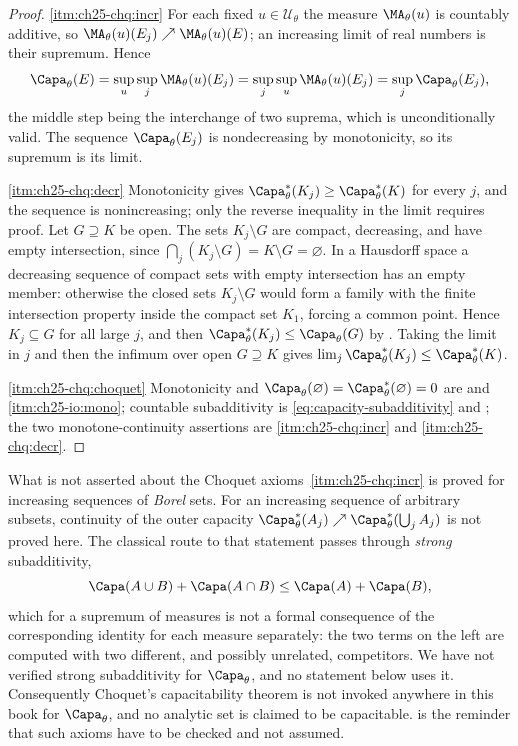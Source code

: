 \begin{proof}
\cref{itm:ch25-chq:incr}  For each fixed \(u\in\mathcal U_\theta\) the measure
\(\MA_\theta(u)\) is countably additive, so
\(\MA_\theta(u)(E_j)\nearrow\MA_\theta(u)(E)\); an increasing limit of real
numbers is their supremum.  Hence
\[
 \Capa_\theta(E)
 =\sup_u\sup_j\MA_\theta(u)(E_j)
 =\sup_j\sup_u\MA_\theta(u)(E_j)
 =\sup_j\Capa_\theta(E_j),
\]
the middle step being the interchange of two suprema, which is
unconditionally valid.  The sequence \(\Capa_\theta(E_j)\) is nondecreasing
by monotonicity, so its supremum is its limit.

\cref{itm:ch25-chq:decr}  Monotonicity gives
\(\Capa_\theta^*(K_j)\geq\Capa^*_\theta(K)\) for every \(j\), and the
sequence is nonincreasing; only the reverse inequality in the limit requires
proof.  Let \(G\supseteq K\) be open.  The sets \(K_j\setminus G\) are
compact, decreasing, and have empty intersection, since
\(\bigcap_j(K_j\setminus G)=K\setminus G=\varnothing\).  In a Hausdorff
space a decreasing sequence of compact sets with empty intersection has an
empty member: otherwise the closed sets \(K_j\setminus G\) would form a
family with the finite intersection property inside the compact set
\(K_1\), forcing a common point.  Hence \(K_j\subseteq G\) for all large
\(j\), and then
\(\Capa^*_\theta(K_j)\leq\Capa_\theta(G)\) by
.  Taking the limit in \(j\) and then the infimum
over open \(G\supseteq K\) gives
\(\lim_j\Capa^*_\theta(K_j)\leq\Capa^*_\theta(K)\).

\cref{itm:ch25-chq:choquet}  Monotonicity and
\(\Capa_\theta(\varnothing)=\Capa^*_\theta(\varnothing)=0\) are
 and
\,\cref{itm:ch25-io:mono}; countable subadditivity
is \eqref{eq:capacity-subadditivity} and
; the two monotone-continuity assertions
are \cref{itm:ch25-chq:incr} and \cref{itm:ch25-chq:decr}.
\end{proof}

\begin{warning}{What is not asserted about the Choquet axioms}
\,\cref{itm:ch25-chq:incr} is proved for
increasing sequences of \emph{Borel} sets.  For an increasing sequence of
arbitrary subsets, continuity of the outer capacity
\(\Capa^*_\theta(A_j)\nearrow\Capa^*_\theta(\bigcup_jA_j)\) is not proved
here.  The classical route to that statement passes through \emph{strong}
subadditivity,
\[
 \Capa(A\cup B)+\Capa(A\cap B)\leq\Capa(A)+\Capa(B),
\]
which for a supremum of measures is not a formal consequence of the
corresponding identity for each measure separately: the two terms on the left
are computed with two different, and possibly unrelated, competitors.  We
have not verified strong subadditivity for \(\Capa_\theta\), and no statement
below uses it.  Consequently Choquet's capacitability theorem is not invoked
anywhere in this book for \(\Capa_\theta\), and no analytic set is claimed to
be capacitable.   is the reminder that such
axioms have to be checked and not assumed.
\end{warning}

